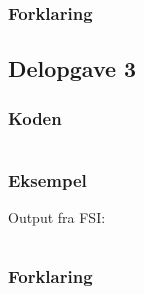 \subsubsection{Forklaring}


\subsection{Delopgave 3}\label{ass:4-3}
\subsubsection{Koden}
\begin{lstlisting}[language=fsharp]

\end{lstlisting}

\subsubsection{Eksempel}
Output fra FSI:
\begin{lstlisting}

\end{lstlisting}

\subsubsection{Forklaring}


